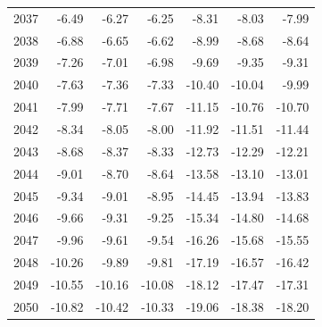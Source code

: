 \begin{table}
\begin{tabular}{lrrrrrr}
2037 & -6.49 & -6.27 & -6.25 & -8.31 & -8.03 & -7.99 \\
2038 & -6.88 & -6.65 & -6.62 & -8.99 & -8.68 & -8.64 \\
2039 & -7.26 & -7.01 & -6.98 & -9.69 & -9.35 & -9.31 \\
2040 & -7.63 & -7.36 & -7.33 & -10.40 & -10.04 & -9.99 \\
2041 & -7.99 & -7.71 & -7.67 & -11.15 & -10.76 & -10.70 \\
2042 & -8.34 & -8.05 & -8.00 & -11.92 & -11.51 & -11.44 \\
2043 & -8.68 & -8.37 & -8.33 & -12.73 & -12.29 & -12.21 \\
2044 & -9.01 & -8.70 & -8.64 & -13.58 & -13.10 & -13.01 \\
2045 & -9.34 & -9.01 & -8.95 & -14.45 & -13.94 & -13.83 \\
2046 & -9.66 & -9.31 & -9.25 & -15.34 & -14.80 & -14.68 \\
2047 & -9.96 & -9.61 & -9.54 & -16.26 & -15.68 & -15.55 \\
2048 & -10.26 & -9.89 & -9.81 & -17.19 & -16.57 & -16.42 \\
2049 & -10.55 & -10.16 & -10.08 & -18.12 & -17.47 & -17.31 \\
2050 & -10.82 & -10.42 & -10.33 & -19.06 & -18.38 & -18.20 \\
\bottomrule
\end{tabular}
\end{table}
